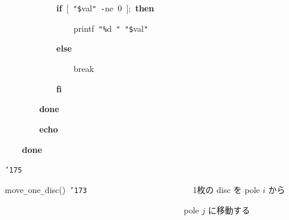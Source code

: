 \documentclass[a4paper,10pt]{article}
\def\mc{\relax}
\begin{document}
\noindent
\mbox{}{\tt\mc \ }{\tt\mc \ }{\tt\mc \ }{\tt\mc \ }{\tt\mc \ }{\tt\mc \ }{\tt\mc \ }{\tt\mc \ }{\tt\mc \ }{\tt\mc \ }{\tt\mc \ }{\tt\mc \ }\textbf{if}{\tt\mc \ }[{\tt\mc \ }{\tt "}{\tt\$}val{\tt "}{\tt\mc \ }{\tt -}ne{\tt\mc \ }0{\tt\mc \ }];{\tt\mc \ }\textbf{then}

\noindent
\mbox{}{\tt\mc \ }{\tt\mc \ }{\tt\mc \ }{\tt\mc \ }{\tt\mc \ }{\tt\mc \ }{\tt\mc \ }{\tt\mc \ }{\tt\mc \ }{\tt\mc \ }{\tt\mc \ }{\tt\mc \ }{\tt\mc \ }{\tt\mc \ }{\tt\mc \ }{\tt\mc \ }printf{\tt\mc \ }{\tt "}{\tt\%}d{\tt\mc \ }{\tt "}{\tt\mc \ }{\tt "}{\tt\$}val{\tt "}

\noindent
\mbox{}{\tt\mc \ }{\tt\mc \ }{\tt\mc \ }{\tt\mc \ }{\tt\mc \ }{\tt\mc \ }{\tt\mc \ }{\tt\mc \ }{\tt\mc \ }{\tt\mc \ }{\tt\mc \ }{\tt\mc \ }\textbf{else}

\noindent
\mbox{}{\tt\mc \ }{\tt\mc \ }{\tt\mc \ }{\tt\mc \ }{\tt\mc \ }{\tt\mc \ }{\tt\mc \ }{\tt\mc \ }{\tt\mc \ }{\tt\mc \ }{\tt\mc \ }{\tt\mc \ }{\tt\mc \ }{\tt\mc \ }{\tt\mc \ }{\tt\mc \ }break

\noindent
\mbox{}{\tt\mc \ }{\tt\mc \ }{\tt\mc \ }{\tt\mc \ }{\tt\mc \ }{\tt\mc \ }{\tt\mc \ }{\tt\mc \ }{\tt\mc \ }{\tt\mc \ }{\tt\mc \ }{\tt\mc \ }\textbf{fi}

\noindent
\mbox{}{\tt\mc \ }{\tt\mc \ }{\tt\mc \ }{\tt\mc \ }{\tt\mc \ }{\tt\mc \ }{\tt\mc \ }{\tt\mc \ }\textbf{done}

\noindent
\mbox{}{\tt\mc \ }{\tt\mc \ }{\tt\mc \ }{\tt\mc \ }{\tt\mc \ }{\tt\mc \ }{\tt\mc \ }{\tt\mc \ }\textbf{echo}

\noindent
\mbox{}{\tt\mc \ }{\tt\mc \ }{\tt\mc \ }{\tt\mc \ }\textbf{done}

\noindent
\mbox{}{\tt\char'175}

\noindent
\mbox{}\hfill

\noindent
\mbox{}move{\tt\_}one{\tt\_}disc(){\tt\mc \ }{\tt\char'173}{\tt\mc \ }{\tt\mc \ }{\tt\mc \ }{\tt\mc \ }{\tt\mc \ }{\tt\mc \ }{\tt\mc \ }{\tt\mc \ }{\tt\mc \ }{\tt\mc \ }{\tt\mc \ }{\tt\mc \ }{\tt\mc \ }{\tt\mc \ }{\tt\mc \ }{\tt\mc \ }{\tt\mc \ }{\tt\mc \ }{\tt\mc \ }{\tt\mc \ }{\tt\mc \ }{\tt\mc \ }{\tt\mc \ }\rm\mc {\tt\#} \ 1枚の disc を pole $i$ から\hfill 
\tt\mc 

\noindent
\mbox{}{\tt\mc \ }{\tt\mc \ }{\tt\mc \ }{\tt\mc \ }{\tt\mc \ }{\tt\mc \ }{\tt\mc \ }{\tt\mc \ }{\tt\mc \ }{\tt\mc \ }{\tt\mc \ }{\tt\mc \ }{\tt\mc \ }{\tt\mc \ }{\tt\mc \ }{\tt\mc \ }{\tt\mc \ }{\tt\mc \ }{\tt\mc \ }{\tt\mc \ }{\tt\mc \ }{\tt\mc \ }{\tt\mc \ }{\tt\mc \ }{\tt\mc \ }{\tt\mc \ }{\tt\mc \ }{\tt\mc \ }{\tt\mc \ }{\tt\mc \ }{\tt\mc \ }{\tt\mc \ }{\tt\mc \ }{\tt\mc \ }{\tt\mc \ }{\tt\mc \ }{\tt\mc \ }{\tt\mc \ }{\tt\mc \ }{\tt\mc \ }\rm\mc {\tt\#} \ pole $j$ に移動する \hfill 
\tt\mc 
\end{document}
